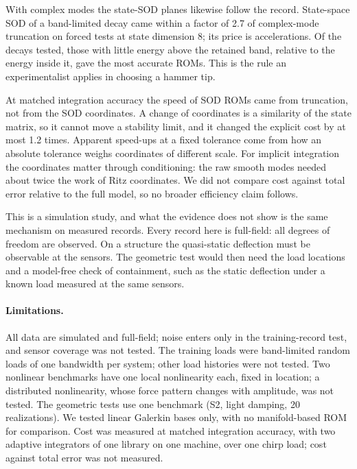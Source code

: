 \documentclass[preprint,12pt]{elsarticle}
\begin{document}
With complex modes the state-SOD planes likewise follow the record. State-space SOD of a band-limited decay came within a factor of 2.7 of complex-mode truncation on forced tests at state dimension 8; its price is accelerations. Of the decays tested, those with little energy above the retained band, relative to the energy inside it, gave the most accurate ROMs. This is the rule an experimentalist applies in choosing a hammer tip.

At matched integration accuracy the speed of SOD ROMs came from truncation, not from the SOD coordinates. A change of coordinates is a similarity of the state matrix, so it cannot move a stability limit, and it changed the explicit cost by at most 1.2 times. Apparent speed-ups at a fixed tolerance come from how an absolute tolerance weighs coordinates of different scale. For implicit integration the coordinates matter through conditioning: the raw smooth modes needed about twice the work of Ritz coordinates. We did not compare cost against total error relative to the full model, so no broader efficiency claim follows.

This is a simulation study, and what the evidence does not show is the same mechanism on measured records. Every record here is full-field: all degrees of freedom are observed. On a structure the quasi-static deflection must be observable at the sensors. The geometric test would then need the load locations and a model-free check of containment, such as the static deflection under a known load measured at the same sensors.

\paragraph{Limitations.} All data are simulated and full-field; noise enters only in the training-record test, and sensor coverage was not tested. The training loads were band-limited random loads of one bandwidth per system; other load histories were not tested. Two nonlinear benchmarks have one local nonlinearity each, fixed in location; a distributed nonlinearity, whose force pattern changes with amplitude, was not tested. The geometric tests use one benchmark (S2, light damping, 20 realizations). We tested linear Galerkin bases only, with no manifold-based ROM \citep{Haller2016,Jain2017} for comparison. Cost was measured at matched integration accuracy, with two adaptive integrators of one library on one machine, over one chirp load; cost against total error was not measured.
\end{document}
